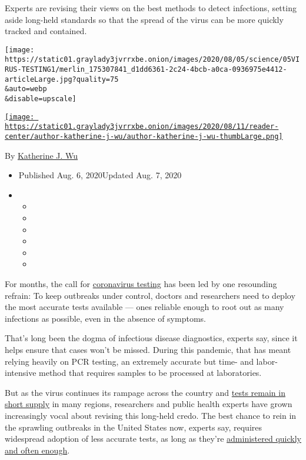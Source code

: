 Experts are revising their views on the best methods to detect
infections, setting aside long-held standards so that the spread of the
virus can be more quickly tracked and contained.

\texttt{[image: https://static01.graylady3jvrrxbe.onion/images/2020/08/05/science/05VIRUS-TESTING1/merlin\_175307841\_d1dd6361-2c24-4bcb-a0ca-0936975e4412-articleLarge.jpg?quality=75\\\&auto=webp\\\&disable=upscale]}

\href{https://www.nytimes3xbfgragh.onion/by/katherine-j--wu}{\texttt{[image: https://static01.graylady3jvrrxbe.onion/images/2020/08/11/reader-center/author-katherine-j-wu/author-katherine-j-wu-thumbLarge.png]}}

By
\href{https://www.nytimes3xbfgragh.onion/by/katherine-j--wu}{Katherine
J. Wu}

\begin{itemize}
\item
  Published Aug. 6, 2020Updated Aug. 7, 2020
\item
  \begin{itemize}
  \item
  \item
  \item
  \item
  \item
  \item
  \end{itemize}
\end{itemize}

For months, the call for
\href{https://www.nytimes3xbfgragh.onion/2020/08/15/us/coronavirus-testing-decrease.html}{coronavirus
testing} has been led by one resounding refrain: To keep outbreaks under
control, doctors and researchers need to deploy the most accurate tests
available --- ones reliable enough to root out as many infections as
possible, even in the absence of symptoms.

That's long been the dogma of infectious disease diagnostics, experts
say, since it helps ensure that cases won't be missed. During this
pandemic, that has meant relying heavily on PCR testing, an extremely
accurate but time- and labor-intensive method that requires samples to
be processed at laboratories.

But as the virus continues its rampage across the country and
\href{https://www.nytimes3xbfgragh.onion/2020/07/19/health/coronavirus-testing-viral-spread.html}{tests
remain in short supply} in many regions, researchers and public health
experts have grown increasingly vocal about revising this long-held
credo. The best chance to rein in the sprawling outbreaks in the United
States now, experts say, requires widespread adoption of less accurate
tests, as long as they're
\href{https://www.nytimes3xbfgragh.onion/2020/07/03/opinion/coronavirus-tests.html}{administered
quickly and often enough}.

